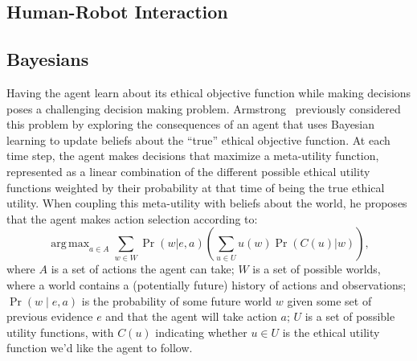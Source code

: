 \documentclass[11pt]{article}
\DeclareMathOperator*{\argmax}{arg\,max}
\begin{document}
\subsection{Human-Robot Interaction}


\subsection{Bayesians}

Having the agent learn about its ethical objective function while making decisions poses a challenging decision making problem. Armstrong~ previously considered this problem by exploring the consequences of an agent that uses Bayesian learning to update beliefs about the ``true'' ethical objective function. At each time step, the agent makes decisions that maximize a meta-utility function, represented as a linear combination of the different possible ethical utility functions weighted by their probability at that time of being the true ethical utility. When coupling this meta-utility with beliefs about the world, he proposes that the agent makes action selection according to:
\begin{equation}
\label{eq:armstrong}
\argmax_{a \in A} \sum_{w \in W} \Pr(w | e, a) \left( \sum_{u \in U} u(w) \Pr(C(u)|w) \right),
\end{equation}
where $A$ is a set of actions the agent can take; $W$ is a set of possible worlds, where a world contains a (potentially future) history of actions and observations; $\Pr(w \mid e, a)$ is the probability of some future world $w$ given some set of previous evidence $e$ and that the agent will take action $a$; $U$ is a set of possible utility functions, with $C(u)$ indicating whether $u \in U$ is the ethical utility function we'd like the agent to follow.
\end{document}

